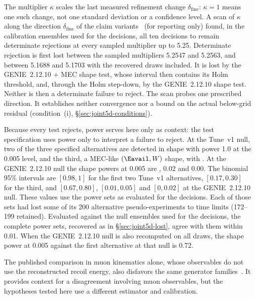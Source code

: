 The multiplier $\kappa$ scales the last measured refinement change $\delta_{\mathrm{fine}}$: $\kappa=1$ means one such change, not one standard deviation or a confidence level. A scan of $\kappa$ along the direction $\delta_{\mathrm{fine}}$ of the claim variants~\cite{JointTestKappa2026} (for reporting only) found, in the calibration ensembles used for the decisions, all ten decisions to remain determinate rejections at every sampled multiplier up to 5.25. Determinate rejection is first lost between the sampled multipliers 5.2547 and 5.2563, and between 5.1688 and 5.1703 with the recovered draws included. It is lost by the GENIE~2.12.10 + MEC shape test, whose interval then contains its Holm threshold, and, through the Holm step-down, by the GENIE~2.12.10 shape test. Neither is then a determinate failure to reject. The scan probes one prescribed direction. It establishes neither convergence nor a bound on the actual below-grid residual (condition~(i), \S\ref{sec:joint5d-conditions}).

Because every test rejects, power serves here only as context: the test specification uses power only to interpret a failure to reject. At the Tune~v1 null, two of the three specified alternatives are detected in shape with power 1.0 at the 0.005 level, and the third, a MEC-like $(\Eavail,W)$ shape, with \jtPowPthree. At the GENIE~2.12.10 null the shape powers at 0.005 are \jtPowPonegShape, 0.02 and 0.00. The binomial 95\% intervals are $[0.98,1]$ for the first two Tune~v1 alternatives, $[0.17,0.30]$ for the third, and $[0.67,0.80]$, $[0.01,0.05]$ and $[0,0.02]$ at the GENIE~2.12.10 null. These values use the power sets as evaluated for the decisions. Each of those sets had lost some of its 200 alternative pseudo-experiments to time limits (172--199 retained). Evaluated against the null ensembles used for the decisions, the complete power sets, recovered as in \S\ref{sec:joint5d-lost}, agree with them within 0.01. When the GENIE~2.12.10 null is also recomputed on all draws, the shape power at 0.005 against the first alternative at that null is 0.72.

The published comparison in muon kinematics alone, whose observables do not use the reconstructed recoil energy, also disfavors the same generator families~\cite{MINERvA:2021owq}. It provides context for a disagreement involving muon observables, but the hypotheses tested here use a different estimator and calibration.

